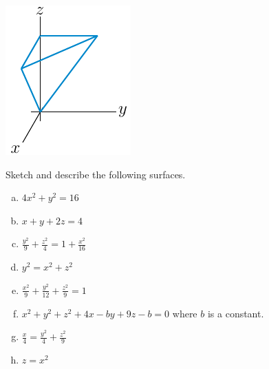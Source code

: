 \begin{solution}
\begin{center}
   \includegraphics{fig/pmidGraph.pdf}\qquad\qquad
\end{center}

\end{solution}




\begin{question}
Sketch and describe the following surfaces.
\begin{enumerate}[(a)]
\item %
$4x^2+y^2=16$

\item %
$x+y+2z=4$  

\item %
$\frac{y^2}{9}+\frac{z^2}{4}=1+\frac{x^2}{16}$ 

\item %
$y^2=x^2+z^2$

\item %
$\frac{x^2}{9}+\frac{y^2}{12}+\frac{z^2}{9}=1$

\item %
$x^2+y^2+z^2+4x-by+9z-b=0$ where $b$ is a constant.

\item %
 $\frac{x}{4}=\frac{y^2}{4}+\frac{z^2}{9}$ 

\item %
$z=x^2$



\end{enumerate}

\end{question}

